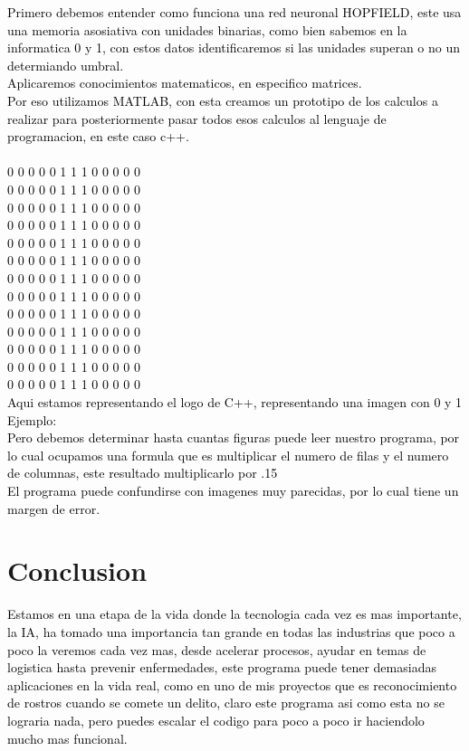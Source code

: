 ﻿\documentclass[10pt]{article} %
\begin{document}
 
 \textcolor{black}{Primero debemos entender como funciona una red neuronal HOPFIELD, este usa una memoria asosiativa con unidades binarias, como bien sabemos en la informatica 0 y 1, con estos datos identificaremos si las unidades superan o no un determiando umbral. \\Aplicaremos conocimientos matematicos, en especifico matrices. \\Por eso utilizamos MATLAB, con esta creamos un prototipo de los calculos a realizar para posteriormente pasar todos esos calculos al lenguaje de programacion, en este caso c++. \\ \\
 
0 0 0 0 0 1 1 1 0 0 0 0 0\\ 
0 0 0 0 0 1 1 1 0 0 0 0 0\\ 
0 0 0 0 0 1 1 1 0 0 0 0 0\\
0 0 0 0 0 1 1 1 0 0 0 0 0\\ 
0 0 0 0 0 1 1 1 0 0 0 0 0\\ 
0 0 0 0 0 1 1 1 0 0 0 0 0\\ 
0 0 0 0 0 1 1 1 0 0 0 0 0\\ 
0 0 0 0 0 1 1 1 0 0 0 0 0\\ 
0 0 0 0 0 1 1 1 0 0 0 0 0\\ 
0 0 0 0 0 1 1 1 0 0 0 0 0\\ 
0 0 0 0 0 1 1 1 0 0 0 0 0\\ 
0 0 0 0 0 1 1 1 0 0 0 0 0\\ 
0 0 0 0 0 1 1 1 0 0 0 0 0\\

 Aqui estamos representando el logo de C++, representando una imagen con 0 y 1 Ejemplo: \\ 
 
 
 Pero debemos determinar hasta cuantas figuras puede leer nuestro programa, por lo cual ocupamos una formula que es multiplicar el numero de filas y el numero de columnas, este resultado multiplicarlo por .15\\ El programa puede confundirse con imagenes muy parecidas, por lo cual tiene un margen de error.  }

 
 

 
\section{Conclusion}

\textcolor{black}{Estamos en una etapa de la vida donde la tecnologia cada vez es mas importante, la IA, ha tomado una importancia tan grande en todas las industrias que poco a poco la veremos cada vez mas, desde acelerar procesos, ayudar en temas de logistica hasta prevenir enfermedades, este programa puede tener demasiadas aplicaciones en la vida real, como en uno de mis proyectos que es reconocimiento de rostros cuando se comete un delito, claro este programa asi como esta no se lograria nada, pero puedes escalar el codigo para poco a poco ir haciendolo mucho mas funcional.}

 

 

 
\end{document}
